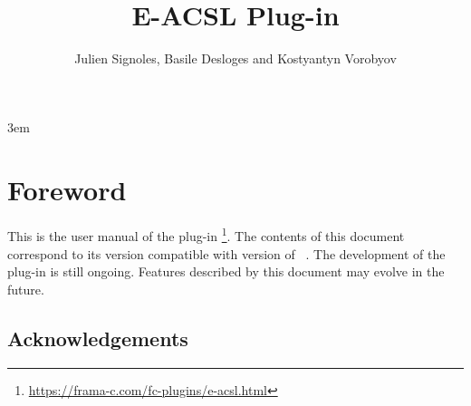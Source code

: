 \documentclass{frama-c-book}
\title{E-ACSL Plug-in}
\author{Julien Signoles, Basile Desloges and Kostyantyn Vorobyov}
\begin{document}
\sloppy
\emergencystretch 3em

\maketitle
\tableofcontents


\chapter*{Foreword}
\markright{}

This is the user manual of the \framac plug-in
\eacsl\footnote{\url{https://frama-c.com/fc-plugins/e-acsl.html}}. The contents
of this document correspond to its version \eacslpluginversion compatible with
version \framacversion{} of \framac~\cite{userman,baudin21cacm}. The development of
the \eacsl plug-in is still ongoing.  Features described by this document may
evolve in the future.

\section*{Acknowledgements}

\insertpeople







\appendix




\cleardoublepage
{}






\cleardoublepage
{}
\printindex
\end{document}
